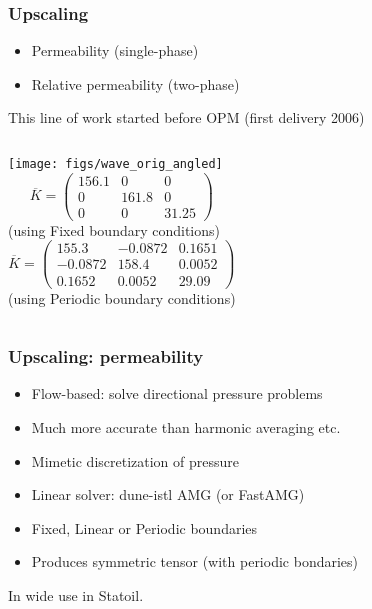 \documentclass[UKenglish,10pt]{beamer}
\begin{document}
\begin{frame}
  \frametitle{Upscaling}
  \begin{itemize}
  \item Permeability (single-phase)
  \item Relative permeability (two-phase)
  \end{itemize}
  \bigskip

  This line of work started before OPM (first delivery 2006)

  \begin{columns}[c]
    \texttt{[image: figs/wave\_orig\_angled]}
    \small
    \begin{equation*}
    \overline{K} =
    \left(
      \begin{array}{ccc}
        156.1 & 0 & 0 \\
        0 & 161.8 & 0 \\
        0 & 0 & 31.25
      \end{array}
    \right)
    \end{equation*}
    (using Fixed boundary conditions)
    \begin{equation*}
    \overline{K} =
    \left(
      \begin{array}{ccc}
        155.3 & -0.0872 & 0.1651 \\
        -0.0872 & 158.4 & 0.0052 \\
        0.1652 & 0.0052 & 29.09 
      \end{array}
    \right)
    \end{equation*}
    (using Periodic boundary conditions)
  \end{columns}
\end{frame}



\begin{frame}
  \frametitle{Upscaling: permeability}
  \begin{itemize}
  \item Flow-based: solve directional pressure problems
  \item Much more accurate than harmonic averaging etc.
  \item Mimetic discretization of pressure
  \item Linear solver: dune-istl AMG (or FastAMG)
  \item Fixed, Linear or Periodic boundaries
  \item Produces symmetric tensor (with periodic bondaries)
  \end{itemize}
  \bigskip

  In wide use in Statoil.
\end{frame}
\end{document}
